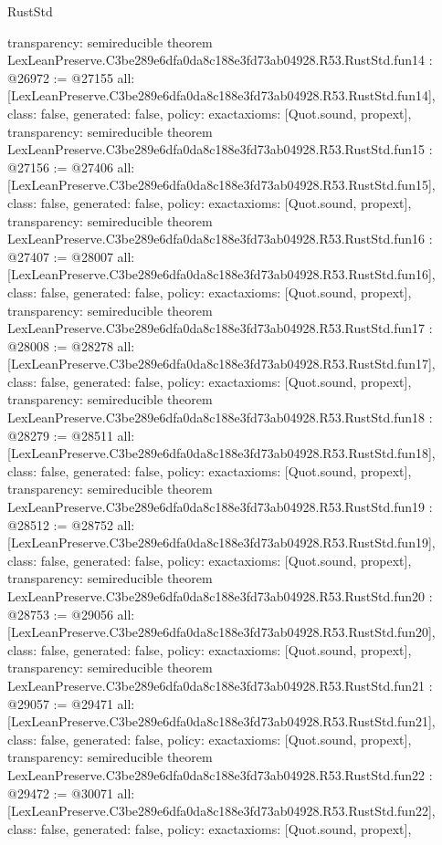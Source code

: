 \begin{lexlean}{RustStd}
\begin{coremodule}
{  transparency: semireducible
}
theorem LexLeanPreserve.C3be289e6dfa0da8c188e3fd73ab04928.R53.RustStd.fun14 : @26972 := @27155 {
  all: [LexLeanPreserve.C3be289e6dfa0da8c188e3fd73ab04928.R53.RustStd.fun14],
  class: false,
  generated: false,
  policy: exact{axioms: [Quot.sound, propext]},
  transparency: semireducible
}
theorem LexLeanPreserve.C3be289e6dfa0da8c188e3fd73ab04928.R53.RustStd.fun15 : @27156 := @27406 {
  all: [LexLeanPreserve.C3be289e6dfa0da8c188e3fd73ab04928.R53.RustStd.fun15],
  class: false,
  generated: false,
  policy: exact{axioms: [Quot.sound, propext]},
  transparency: semireducible
}
theorem LexLeanPreserve.C3be289e6dfa0da8c188e3fd73ab04928.R53.RustStd.fun16 : @27407 := @28007 {
  all: [LexLeanPreserve.C3be289e6dfa0da8c188e3fd73ab04928.R53.RustStd.fun16],
  class: false,
  generated: false,
  policy: exact{axioms: [Quot.sound, propext]},
  transparency: semireducible
}
theorem LexLeanPreserve.C3be289e6dfa0da8c188e3fd73ab04928.R53.RustStd.fun17 : @28008 := @28278 {
  all: [LexLeanPreserve.C3be289e6dfa0da8c188e3fd73ab04928.R53.RustStd.fun17],
  class: false,
  generated: false,
  policy: exact{axioms: [Quot.sound, propext]},
  transparency: semireducible
}
theorem LexLeanPreserve.C3be289e6dfa0da8c188e3fd73ab04928.R53.RustStd.fun18 : @28279 := @28511 {
  all: [LexLeanPreserve.C3be289e6dfa0da8c188e3fd73ab04928.R53.RustStd.fun18],
  class: false,
  generated: false,
  policy: exact{axioms: [Quot.sound, propext]},
  transparency: semireducible
}
theorem LexLeanPreserve.C3be289e6dfa0da8c188e3fd73ab04928.R53.RustStd.fun19 : @28512 := @28752 {
  all: [LexLeanPreserve.C3be289e6dfa0da8c188e3fd73ab04928.R53.RustStd.fun19],
  class: false,
  generated: false,
  policy: exact{axioms: [Quot.sound, propext]},
  transparency: semireducible
}
theorem LexLeanPreserve.C3be289e6dfa0da8c188e3fd73ab04928.R53.RustStd.fun20 : @28753 := @29056 {
  all: [LexLeanPreserve.C3be289e6dfa0da8c188e3fd73ab04928.R53.RustStd.fun20],
  class: false,
  generated: false,
  policy: exact{axioms: [Quot.sound, propext]},
  transparency: semireducible
}
theorem LexLeanPreserve.C3be289e6dfa0da8c188e3fd73ab04928.R53.RustStd.fun21 : @29057 := @29471 {
  all: [LexLeanPreserve.C3be289e6dfa0da8c188e3fd73ab04928.R53.RustStd.fun21],
  class: false,
  generated: false,
  policy: exact{axioms: [Quot.sound, propext]},
  transparency: semireducible
}
theorem LexLeanPreserve.C3be289e6dfa0da8c188e3fd73ab04928.R53.RustStd.fun22 : @29472 := @30071 {
  all: [LexLeanPreserve.C3be289e6dfa0da8c188e3fd73ab04928.R53.RustStd.fun22],
  class: false,
  generated: false,
  policy: exact{axioms: [Quot.sound, propext]},
}
\end{coremodule}
\end{lexlean}
